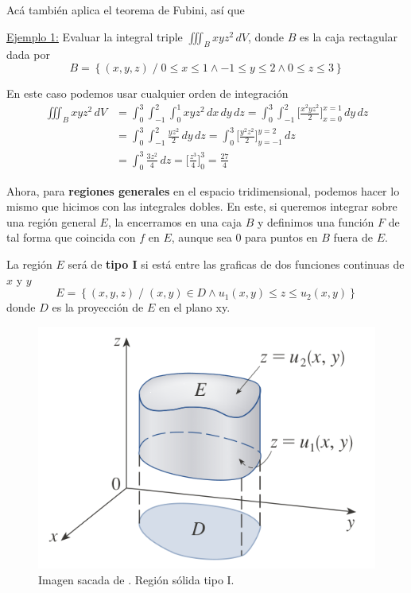 \documentclass[12pt]{article}
\begin{document}
Acá también aplica el teorema de Fubini, así que 

\vspace{0.2cm}
\vspace{0.2cm}

\underline{Ejemplo 1:} Evaluar la integral triple $ \iiint_{B} xyz^2 \,dV $, donde $ B $ es la caja rectagular dada por
\[
  B=\left\{(x,y,z) \;/\; 0\leq x\leq 1 \land -1\leq y\leq 2 \land 0\leq z\leq 3\right\}
\]

En este caso podemos usar cualquier orden de integración
\begin{align*}
  \iiint_{B} xyz^2 \,dV &= \int_{0}^{3} \int_{-1}^{2} \int_{0}^{1} xyz^2 \,dx\,dy\,dz=\int_{0}^{3} \int_{-1}^{2} \Bigg[\frac{x^2yz^2}{2}\Bigg]_{x=0}^{x=1} \,dy\,dz\\
   &= \int_{0}^{3} \int_{-1}^{2} \frac{yz^2}{2} \,dy\,dz=\int_{0}^{3} \Bigg[\frac{y^2z^2}{2}\Bigg]_{y=-1}^{y=2} \,dz\\
    &= \int_{0}^{3} \frac{3z^2}{4} \,dz = \Bigg[\frac{z^3}{4}\Bigg]_{0}^{3}=\frac{27}{4}
\end{align*}

Ahora, para \textbf{regiones generales} en el espacio tridimensional, podemos hacer lo mismo que hicimos con las integrales dobles. En este, si queremos integrar sobre una región general $ E $, la encerramos en una caja $ B $ y definimos una función $ F $ de tal forma que coincida con $ f $ en $ E $, aunque sea 0 para puntos en $ B $ fuera de $ E $. 

La región $ E $ será de \textbf{tipo I} si está entre las graficas de dos funciones continuas de $ x $ y $ y $
\[
	E=\left\{(x,y,z) \;/\; (x,y) \in D \land u_{1}(x,y)\leq z\leq u_{2}(x,y)\right\}
\]
donde $ D $ es la proyección de $ E $ en el plano xy.

\begin{figure}[H]
  \centering
  \includegraphics[width=0.5\linewidth]{imagenes/int_triple_region_tipoI.png}
  \caption{Imagen sacada de \parencite{stewart2}. Región sólida tipo I.}
  \label{int_triple_tipoI}
\end{figure}
\end{document}
